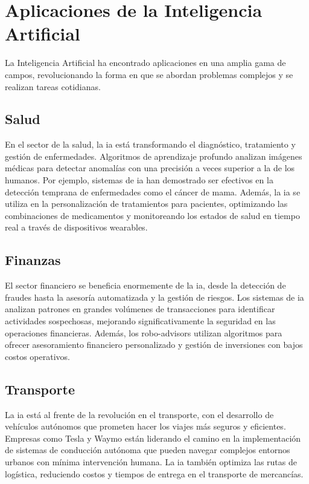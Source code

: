 \section{Aplicaciones de la Inteligencia Artificial}

La Inteligencia Artificial ha encontrado aplicaciones en una amplia gama de campos, revolucionando la forma en que se abordan problemas complejos y se realizan tareas cotidianas.

\subsection{Salud}

En el sector de la salud, la \acrshort{ia} está transformando el diagnóstico, tratamiento y gestión de enfermedades. Algoritmos de aprendizaje profundo analizan imágenes médicas para detectar anomalías con una precisión a veces superior a la de los humanos. Por ejemplo, sistemas de \acrshort{ia} han demostrado ser efectivos en la detección temprana de enfermedades como el cáncer de mama. Además, la \acrshort{ia} se utiliza en la personalización de tratamientos para pacientes, optimizando las combinaciones de medicamentos y monitoreando los estados de salud en tiempo real a través de dispositivos wearables.

\subsection{Finanzas}

El sector financiero se beneficia enormemente de la \acrshort{ia}, desde la detección de fraudes hasta la asesoría automatizada y la gestión de riesgos. Los sistemas de \acrshort{ia} analizan patrones en grandes volúmenes de transacciones para identificar actividades sospechosas, mejorando significativamente la seguridad en las operaciones financieras. Además, los robo-advisors utilizan algoritmos para ofrecer asesoramiento financiero personalizado y gestión de inversiones con bajos costos operativos.

\subsection{Transporte}

La \acrshort{ia} está al frente de la revolución en el transporte, con el desarrollo de vehículos autónomos que prometen hacer los viajes más seguros y eficientes. Empresas como Tesla y Waymo están liderando el camino en la implementación de sistemas de conducción autónoma que pueden navegar complejos entornos urbanos con mínima intervención humana. La \acrshort{ia} también optimiza las rutas de logística, reduciendo costos y tiempos de entrega en el transporte de mercancías.

